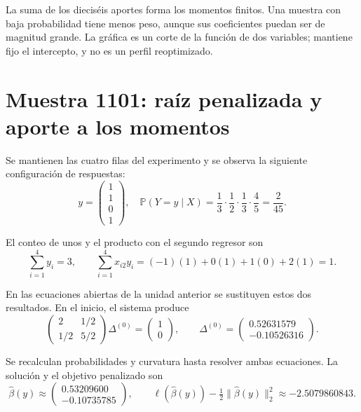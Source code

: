 \documentclass[11pt,a4paper]{article}
\newcommand{\Prob}{\mathbb P}
\begin{document}
La suma de los dieciséis aportes forma los momentos finitos.
Una muestra con baja probabilidad tiene menos peso,
aunque sus coeficientes puedan ser de magnitud grande.
La gráfica es un corte de la función de dos variables;
mantiene fijo el intercepto, y no es un perfil reoptimizado.
\endgroup

\clearpage
\section{Muestra 1101: raíz penalizada y aporte a los momentos}\label{logit138}
\begingroup\small
\setlength{\abovedisplayskip}{4pt}\setlength{\belowdisplayskip}{4pt}
Se mantienen las cuatro filas del experimento y se observa
la siguiente configuración de respuestas:
\[
y=\begin{pmatrix}1\\1\\0\\1\end{pmatrix},\quad \Prob(Y=y\mid X)=\frac{1}{3}\cdot\frac{1}{2}\cdot\frac{1}{3}\cdot\frac{4}{5}=\frac{2}{45}.
\]

El conteo de unos y el producto con el segundo regresor son
\[
\sum_{i=1}^4 y_i=3,\qquad\sum_{i=1}^4x_{i2}y_i=(-1)(1)+0(1)+1(0)+2(1)=1.
\]

En las ecuaciones abiertas de la unidad anterior se sustituyen
estos dos resultados. En el inicio, el sistema produce
\[
\begin{pmatrix}2&1/2\\1/2&5/2\end{pmatrix}\Delta^{(0)}=\begin{pmatrix}1\\0\end{pmatrix},\qquad\Delta^{(0)}=\begin{pmatrix}0.52631579\\-0.10526316\end{pmatrix}.
\]

Se recalculan probabilidades y curvatura hasta resolver
ambas ecuaciones. La solución y el objetivo penalizado son
\[
\widehat\beta(y)\approx\begin{pmatrix}0.53209600\\-0.10735785\end{pmatrix},\qquad \ell(\widehat\beta(y))-\tfrac12\|\widehat\beta(y)\|_2^2\approx-2.5079860843.
\]
\end{document}
